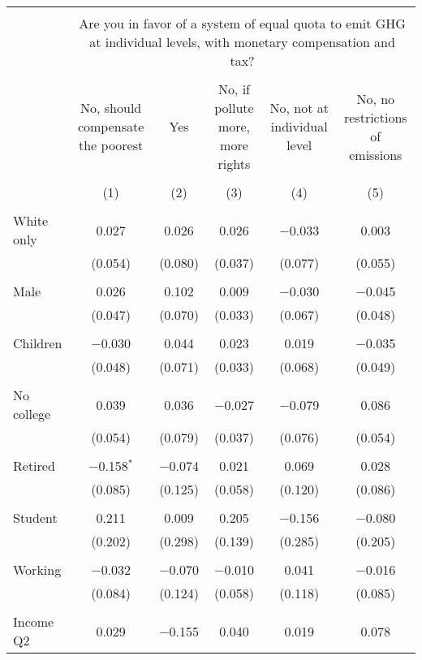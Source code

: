 
\begin{tabular}{@{\extracolsep{5pt}}lccccc} 
\\[-1.8ex]\hline 
\hline \\[-1.8ex] 
 & \multicolumn{5}{c}{Are you in favor of a system of equal quota to emit GHG at individual levels, with monetary compensation and tax?} \\ 
\cline{2-6} 
\\[-1.8ex] & No, should compensate the poorest & Yes & No, if pollute more, more rights & No, not at individual level & No, no restrictions of emissions \\ 
\\[-1.8ex] & (1) & (2) & (3) & (4) & (5)\\ 
\hline \\[-1.8ex] 
 White only & 0.027 & 0.026 & 0.026 & $-$0.033 & 0.003 \\ 
  & (0.054) & (0.080) & (0.037) & (0.077) & (0.055) \\ 
  & & & & & \\ 
 Male & 0.026 & 0.102 & 0.009 & $-$0.030 & $-$0.045 \\ 
  & (0.047) & (0.070) & (0.033) & (0.067) & (0.048) \\ 
  & & & & & \\ 
 Children & $-$0.030 & 0.044 & 0.023 & 0.019 & $-$0.035 \\ 
  & (0.048) & (0.071) & (0.033) & (0.068) & (0.049) \\ 
  & & & & & \\ 
 No college & 0.039 & 0.036 & $-$0.027 & $-$0.079 & 0.086 \\ 
  & (0.054) & (0.079) & (0.037) & (0.076) & (0.054) \\ 
  & & & & & \\ 
 Retired & $-$0.158$^{*}$ & $-$0.074 & 0.021 & 0.069 & 0.028 \\ 
  & (0.085) & (0.125) & (0.058) & (0.120) & (0.086) \\ 
  & & & & & \\ 
 Student & 0.211 & 0.009 & 0.205 & $-$0.156 & $-$0.080 \\ 
  & (0.202) & (0.298) & (0.139) & (0.285) & (0.205) \\ 
  & & & & & \\ 
 Working & $-$0.032 & $-$0.070 & $-$0.010 & 0.041 & $-$0.016 \\ 
  & (0.084) & (0.124) & (0.058) & (0.118) & (0.085) \\ 
  & & & & & \\ 
 Income Q2 & 0.029 & $-$0.155 & 0.040 & 0.019 & 0.078 \\ 

\end{tabular}
